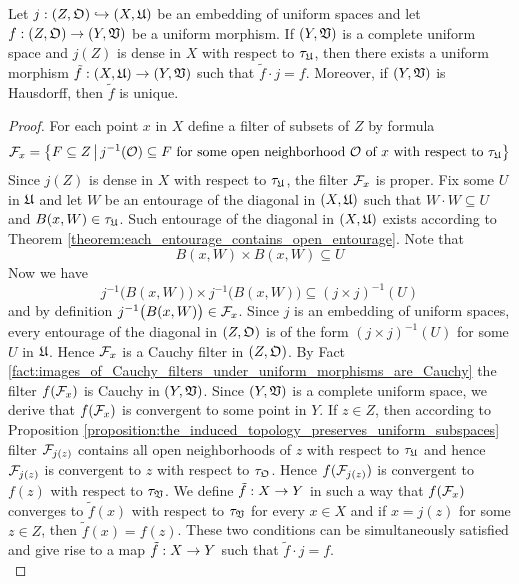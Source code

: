 \begin{theorem}\label{theorem:extensions_of_uniform_morphisms_to_complete_spaces}
Let $j:\left(Z,{\mathfrak O} \right) \hookrightarrow \left(X,{\mathfrak U}\right)$ be an embedding of uniform spaces and let $f:\left(Z,{\mathfrak O}\right)\rightarrow \left(Y,{\mathfrak V}\right)$ be a uniform morphism. If $\left(Y,{\mathfrak V}\right)$ is a complete uniform space and $j(Z)$ is dense in $X$ with respect to $\tau_{{\mathfrak U}}$, then there exists a uniform morphism $\tilde{f}:\left(X,{\mathfrak U}\right)\rightarrow \left(Y,{\mathfrak V}\right)$ such that $\tilde{f}\cdot j = f$. Moreover, if $\left(Y,{\mathfrak V}\right)$ is Hausdorff, then $\tilde{f}$ is unique.
\end{theorem}
\begin{proof}
For each point $x$ in $X$ define a filter of subsets of $Z$ by formula
$${\mathcal F}_x = \big\{F\subseteq Z\,\big|\,j^{-1}({\mathcal O})\subseteq F\mbox{ for some open neighborhood }{\mathcal O}\mbox{ of }x\mbox{ with respect to }\tau_{{\mathfrak U}}\big\}$$
Since $j(Z)$ is dense in $X$ with respect to $\tau_{{\mathfrak U}}$, the filter ${\mathcal F}_x$ is proper. Fix some $U$ in ${\mathfrak U}$ and let $W$ be an entourage of the diagonal in $(X,{\mathfrak U})$ such that $W\cdot W\subseteq U$ and $B(x,W) \in \tau_{{\mathfrak U}}$. Such entourage of the diagonal in $(X,{\mathfrak U})$ exists according to Theorem \ref{theorem:each_entourage_contains_open_entourage}. Note that
$$B(x,W) \times B(x,W) \subseteq U$$
Now we have 
$$j^{-1}\big(B(x,W)\big)\times j^{-1}\big(B(x,W)\big) \subseteq \left(j\times j\right)^{-1}(U)$$
and by definition $j^{-1}\big(B(x,W)\big) \in {\mathcal F}_x$. Since $j$ is an embedding of uniform spaces, every entourage of the diagonal in $(Z,{\mathfrak O})$ is of the form $\left(j\times j\right)^{-1}(U)$ for some $U$ in ${\mathfrak U}$. Hence ${\mathcal F}_x$ is a Cauchy filter in $\left(Z,{\mathfrak O}\right)$. By Fact \ref{fact:images_of_Cauchy_filters_under_uniform_morphisms_are_Cauchy} the filter $f({\mathcal F}_x)$ is Cauchy in $\left(Y,{\mathfrak V}\right)$. Since $\left(Y,{\mathfrak V}\right)$ is a complete uniform space, we derive that $f({\mathcal F}_x)$ is convergent to some point in $Y$. If $z\in Z$, then according to Proposition \ref{proposition:the_induced_topology_preserves_uniform_subspaces} filter ${\mathcal F}_{j(z)}$ contains all open neighborhoods of $z$ with respect to $\tau_{{\mathfrak U}}$ and hence ${\mathcal F}_{j(z)}$ is convergent to $z$ with respect to $\tau_{{\mathfrak O}}$. Hence $f({\mathcal F}_{j(z)})$ is convergent to $f(z)$ with respect to $\tau_{{\mathfrak V}}$. We define $\tilde{f}:X\rightarrow Y$ in such a way that $f({\mathcal F}_x)$ converges to $\tilde{f}(x)$ with respect to $\tau_{{\mathfrak V}}$ for every $x\in X$ and if $x = j(z)$ for some $z\in Z$, then $\tilde{f}(x) = f(z)$. These two conditions can be simultaneously satisfied and give rise to a map $\tilde{f}:X\rightarrow Y$ such that $\tilde{f}\cdot j = f$.\\

\end{proof}
